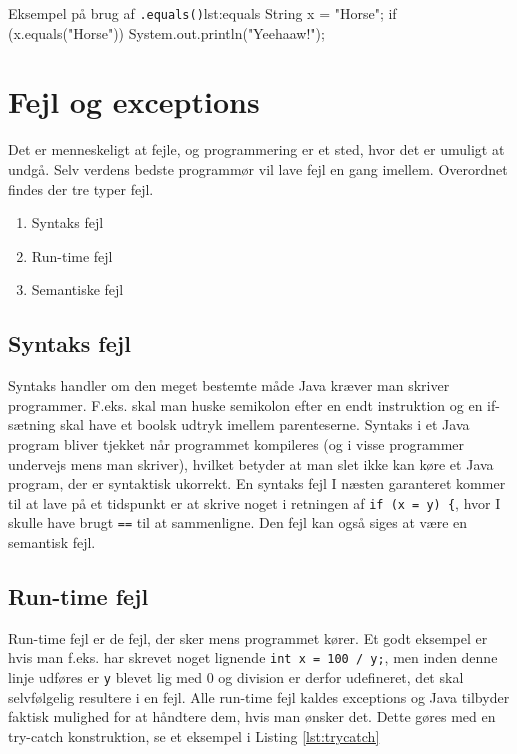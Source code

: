 \begin{JavaCode}{Eksempel på brug af \texttt{.equals()}}{lst:equals}
String x = "Horse";
if (x.equals("Horse")) {
	System.out.println("Yeehaaw!");
}
\end{JavaCode}

\section{Fejl og exceptions}
Det er menneskeligt at fejle, og programmering er et sted, hvor det er umuligt at undgå. Selv verdens bedste programmør vil lave fejl en gang imellem. Overordnet findes der tre typer fejl.

\begin{enumerate}
	\item Syntaks fejl
	\item Run-time fejl
	\item Semantiske fejl
\end{enumerate}

\subsection{Syntaks fejl}
Syntaks handler om den meget bestemte måde Java kræver man skriver programmer. F.eks. skal man huske semikolon efter en endt instruktion og en if-sætning skal have et boolsk udtryk imellem parenteserne. Syntaks i et Java program bliver tjekket når programmet kompileres (og i visse programmer undervejs mens man skriver), hvilket betyder at man slet ikke kan køre et Java program, der er syntaktisk ukorrekt. En syntaks fejl I næsten garanteret kommer til at lave på et tidspunkt er at skrive noget i retningen af \texttt{if (x = y) \{}, hvor I skulle have brugt \texttt{==} til at sammenligne. Den fejl kan også siges at være en semantisk fejl.

\subsection{Run-time fejl}
Run-time fejl er de fejl, der sker mens programmet kører. Et godt eksempel er hvis man f.eks. har skrevet noget lignende \texttt{int x = 100 / y;}, men inden denne linje udføres er \texttt{y} blevet lig med 0 og division er derfor udefineret, det skal selvfølgelig resultere i en fejl. Alle run-time fejl kaldes exceptions og Java tilbyder faktisk mulighed for at håndtere dem, hvis man ønsker det. Dette gøres med en try-catch konstruktion, se et eksempel i Listing \ref{lst:trycatch}

